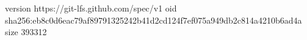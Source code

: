 version https://git-lfs.github.com/spec/v1
oid sha256:eb8c0d6eac79af89791325242b41d2cd124f7ef075a949db2c814a4210b6ad4a
size 393312
